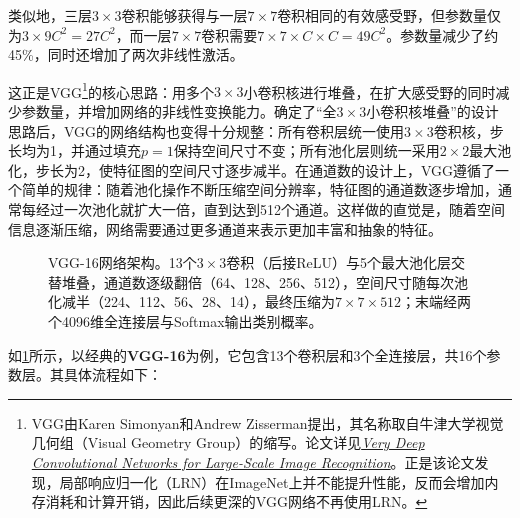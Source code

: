 类似地，三层$3\times3$卷积能够获得与一层$7\times7$卷积相同的有效感受野，但参数量仅为$3\times9C^2=27C^2$，而一层$7\times7$卷积需要$7\times7\times C\times C=49C^2$。参数量减少了约45\%，同时还增加了两次非线性激活。

这正是VGG\footnote{VGG由Karen Simonyan和Andrew Zisserman提出，其名称取自牛津大学视觉几何组（Visual Geometry Group）的缩写。论文详见\href{https://www.robots.ox.ac.uk/~vgg/publications/2015/Simonyan15/simonyan15.pdf}{\textit{Very Deep Convolutional Networks for Large-Scale Image Recognition}}。正是该论文发现，局部响应归一化（LRN）在ImageNet上并不能提升性能，反而会增加内存消耗和计算开销，因此后续更深的VGG网络不再使用LRN。}的核心思路：用多个$3\times3$小卷积核进行堆叠，在扩大感受野的同时减少参数量，并增加网络的非线性变换能力。确定了“全$3\times3$小卷积核堆叠”的设计思路后，VGG的网络结构也变得十分规整：所有卷积层统一使用$3\times3$卷积核，步长均为1，并通过填充$p=1$保持空间尺寸不变；所有池化层则统一采用$2\times2$最大池化，步长为2，使特征图的空间尺寸逐步减半。在通道数的设计上，VGG遵循了一个简单的规律：随着池化操作不断压缩空间分辨率，特征图的通道数逐步增加，通常每经过一次池化就扩大一倍，直到达到512个通道。这样做的直觉是，随着空间信息逐渐压缩，网络需要通过更多通道来表示更加丰富和抽象的特征。

\begin{figure}[H]
    \caption{VGG-16网络架构。13个$3\times 3$卷积（后接ReLU）与5个最大池化层交替堆叠，通道数逐级翻倍（64、128、256、512），空间尺寸随每次池化减半（224、112、56、28、14），最终压缩为$7\times 7\times 512$；末端经两个4096维全连接层与Softmax输出类别概率。}
    \label{fig:vggnet}
\end{figure}

如\cref{fig:vggnet}所示，以经典的\textbf{VGG-16}为例，它包含13个卷积层和3个全连接层，共16个参数层。其具体流程如下：

